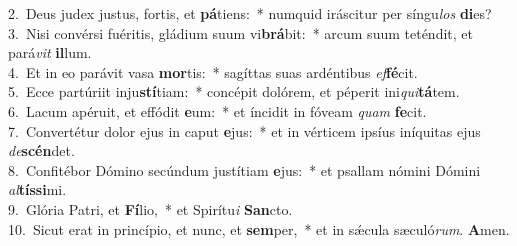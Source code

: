 {2.~}Deus judex justus, fortis, et \textbf{pá}tiens:~* numquid iráscitur per síngu\textit{los} \textbf{di}es?\\
{3.~}Nisi convérsi fuéritis, gládium suum vi\textbf{brá}bit:~* arcum suum teténdit, et pará\textit{vit} \textbf{il}lum.\\
{4.~}Et in eo parávit vasa \textbf{mor}tis:~* sagíttas suas ardéntibus \textit{ef}\textbf{fé}cit.\\
{5.~}Ecce partúriit inju\textbf{stí}tiam:~* concépit dolórem, et péperit ini\textit{qui}\textbf{tá}tem.\\
{6.~}Lacum apéruit, et effódit \textbf{e}um:~* et íncidit in fóveam \textit{quam} \textbf{fe}cit.\\
{7.~}Convertétur dolor ejus in caput \textbf{e}jus:~* et in vérticem ipsíus iníquitas ejus \textit{de}\textbf{scén}det.\\
{8.~}Confitébor Dómino secúndum justítiam \textbf{e}jus:~* et psallam nómini Dómini \textit{al}\textbf{tís}\textbf{si}mi.\\
{9.~}Glória Patri, et \textbf{Fí}lio,~* et Spirítu\textit{i} \textbf{San}cto.\\
{10.~}Sicut erat in princípio, et nunc, et \textbf{sem}per,~* et in sǽcula sæculó\textit{rum}. \textbf{A}men.\\
